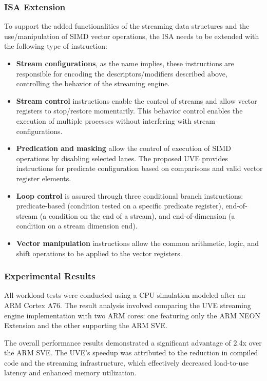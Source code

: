 \subsubsection{ISA Extension}
To support the added functionalities of the streaming data structures and the use/manipulation of SIMD vector operations, the ISA needs to be extended with the following type of instruction: 
\begin{itemize}
    \item \textbf{Stream configurations}, as the name implies, these instructions are responsible for encoding the descriptors/modifiers described above, controlling the behavior of the streaming engine. 

    \item \textbf{Stream control} instructions enable the control of streams and allow vector registers to stop/restore momentarily. This behavior control enables the execution of multiple processes without interfering with stream configurations.

    \item \textbf{Predication and masking} allow the control of execution of SIMD operations by disabling selected lanes. The proposed UVE provides instructions for predicate configuration based on comparisons and valid vector register elements.

    \item \textbf{Loop control} is assured through three conditional branch instructions: predicate-based (condition tested on a specific predicate register), end-of-stream (a condition on the end of a stream), and end-of-dimension (a condition on a stream dimension end).

    \item \textbf{Vector manipulation} instructions allow the common arithmetic, logic, and shift operations to be applied to the vector registers.
\end{itemize}


\subsubsection{Experimental Results}

All workload tests were conducted using a CPU simulation modeled after an ARM Cortex A76. The result analysis involved comparing the UVE streaming engine implementation with two ARM cores: one featuring only the ARM NEON Extension and the other supporting the ARM SVE.

The overall performance results demonstrated a significant advantage of 2.4x over the ARM SVE. The UVE's speedup was attributed to the reduction in compiled code and the streaming infrastructure, which effectively decreased load-to-use latency and enhanced memory utilization.

